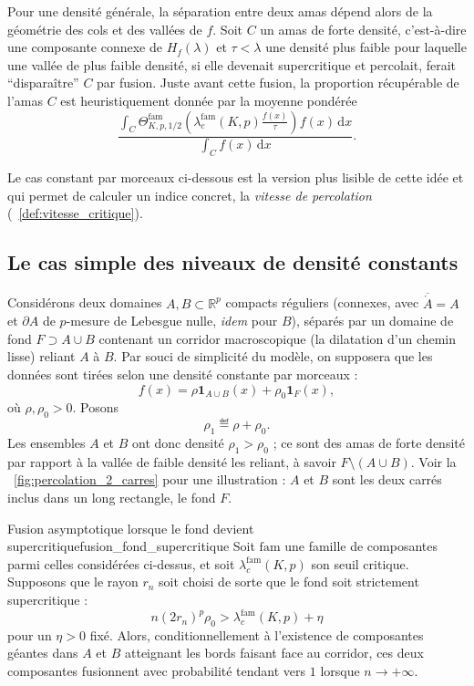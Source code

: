 Pour une densité générale, la séparation entre deux amas dépend alors de la géométrie des cols et des vallées de $f$. 
Soit $C$ un amas de forte densité, c'est-à-dire une composante connexe de $H_f(\lambda)$ et $\tau < \lambda$ une densité plus faible pour laquelle une vallée de plus faible densité, si elle devenait supercritique et percolait, ferait ``disparaître'' $C$ par fusion.
Juste avant cette fusion, la proportion récupérable de l'amas $C$ est heuristiquement donnée par la moyenne pondérée
\begin{equation}\label{eq:frac_recouvrement}
    \frac{
        \displaystyle \int_C
        \Theta^{\mathrm{fam}}_{K,p,1/2}
        \left(
            \lambda_c^{\mathrm{fam}}(K,p)\frac{f(x)}{\tau}
        \right)
        f(x)\,\mathrm dx
    }{
        \displaystyle \int_C f(x)\,\mathrm dx
    }.
\end{equation}

Le cas constant par morceaux ci-dessous est la version plus lisible de cette idée et qui permet de calculer un indice concret, la \emph{vitesse de percolation} (\Def~\ref{def:vitesse_critique}).

\subsection{Le cas simple des niveaux de densité constants}

Considérons deux domaines $A,B\subset\mathbb R^p$ compacts réguliers (connexes, avec $\overline{\mathring{A}} = A$ et $\partial A$ de $p$-mesure de Lebesgue nulle, \emph{idem} pour $B$), séparés par un domaine de fond $F \supset A \cup B$ contenant un corridor macroscopique (la dilatation d'un chemin lisse) reliant $A$ à $B$. Par souci de simplicité du modèle, on supposera que les données sont tirées selon une densité constante par morceaux :
\[
    f(x)=
    \rho\mathbf 1_{A\cup B}(x)+\rho_0\mathbf 1_F(x),
\]
où $\rho, \rho_0 > 0$. Posons
\[
    \rho_1 \eqdef \rho+\rho_0.
\]
Les ensembles $A$ et $B$ ont donc densité $\rho_1>\rho_0$ ; ce sont des amas de forte densité par rapport à la vallée de faible densité les reliant, à savoir $F \setminus (A\cup B)$. Voir la \Fig~\ref{fig:percolation_2_carres} pour une illustration : $A$ et $B$ sont les deux carrés inclus dans un long rectangle, le fond $F$.

\begin{Fait}{Fusion asymptotique lorsque le fond devient supercritique}{fusion_fond_supercritique}
Soit $\mathrm{fam}$ une famille de composantes parmi celles considérées ci-dessus, et soit $\lambda_c^{\mathrm{fam}}(K,p)$ son seuil critique. Supposons que le rayon $r_n$ soit choisi de sorte que le fond soit strictement supercritique :
\[
    n(2r_n)^p\rho_0
    >
    \lambda_c^{\mathrm{fam}}(K,p)+\eta
\]
pour un $\eta>0$ fixé. Alors, conditionnellement à l'existence de composantes géantes dans $A$ et $B$ atteignant les bords faisant face au corridor, ces deux composantes fusionnent avec probabilité tendant vers $1$ lorsque $n\to+\infty$.
\end{Fait}

